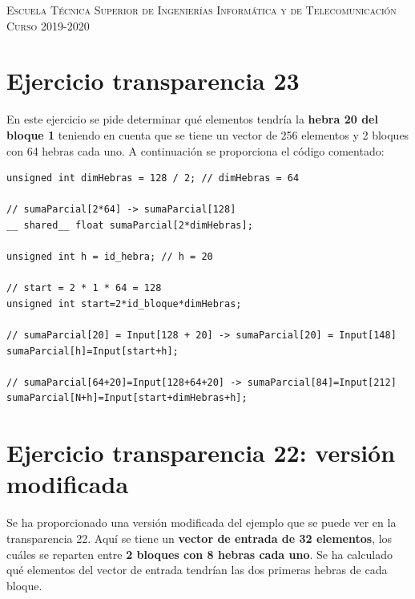 \documentclass[11pt,a4paper]{article}
\begin{document}
\begin{titlepage}
\begin{minipage}{\textwidth}
\vspace{0.7cm}
\textsc{Escuela Técnica Superior de Ingenierías Informática y de Telecomunicación}\\
\vspace{1cm}
\textsc{Curso 2019-2020}
\end{minipage}
\end{titlepage}

\tableofcontents
\thispagestyle{empty}				%

\newpage

\setlength{\parskip}{1em}

\section{Ejercicio transparencia 23}

En este ejercicio se pide determinar qué elementos tendría la \textbf{hebra 20 del bloque 1}
teniendo en cuenta que se tiene un vector de 256 elementos y 2 bloques con 64 hebras cada
uno. A continuación se proporciona el código comentado:

\begin{lstlisting}
unsigned int dimHebras = 128 / 2; // dimHebras = 64

// sumaParcial[2*64] -> sumaParcial[128]
__ shared__ float sumaParcial[2*dimHebras];

unsigned int h = id_hebra; // h = 20

// start = 2 * 1 * 64 = 128
unsigned int start=2*id_bloque*dimHebras;

// sumaParcial[20] = Input[128 + 20] -> sumaParcial[20] = Input[148]
sumaParcial[h]=Input[start+h];

// sumaParcial[64+20]=Input[128+64+20] -> sumaParcial[84]=Input[212]
sumaParcial[N+h]=Input[start+dimHebras+h];
\end{lstlisting}

\section{Ejercicio transparencia 22: versión modificada}

Se ha proporcionado una versión modificada del ejemplo que se puede ver en la
transparencia 22. Aquí se tiene un \textbf{vector de entrada de 32 elementos}, los cuáles
se reparten entre \textbf{2 bloques con 8 hebras cada uno}. Se ha calculado qué elementos
del vector de entrada tendrían las dos primeras hebras de cada bloque.
\end{document}
